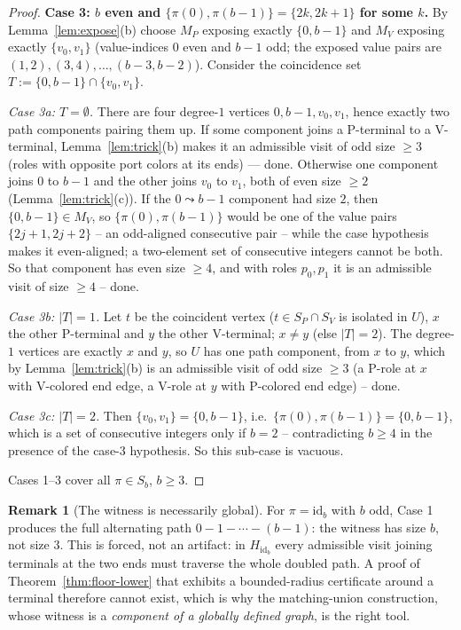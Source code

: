 \documentclass[11pt]{article}
\theoremstyle{definition}
\newtheorem{remark}[theorem]{Remark}
\begin{document}
\begin{proof}
\medskip
\noindent\textbf{Case 3: $b$ even and $\{\pi(0), \pi(b-1)\} = \{2k, 2k+1\}$ for some
$k$.}
By Lemma~\ref{lem:expose}(b) choose $M_P$ exposing exactly $\{0, b-1\}$ and $M_V$
exposing exactly $\{v_0, v_1\}$ (value-indices $0$ even and $b-1$ odd; the exposed
value pairs are $(1,2), (3,4), \dots, (b-3,b-2)$). Consider the coincidence set
$T := \{0, b-1\} \cap \{v_0, v_1\}$.

\emph{Case 3a: $T = \emptyset$.} There are four degree-$1$ vertices
$0, b-1, v_0, v_1$, hence exactly two path components pairing them up. If some
component joins a P-terminal to a V-terminal, Lemma~\ref{lem:trick}(b) makes it an
admissible visit of odd size $\ge 3$ (roles with opposite port colors at its ends) ---
done. Otherwise one component joins $0$ to $b-1$ and the other joins $v_0$ to $v_1$,
both of even size $\ge 2$ (Lemma~\ref{lem:trick}(c)). If the $0 \leadsto b-1$
component had size $2$, then $\{0,b-1\} \in M_V$, so $\{\pi(0), \pi(b-1)\}$ would be
one of the value pairs $\{2j+1, 2j+2\}$ -- an odd-aligned consecutive pair -- while
the case hypothesis makes it even-aligned; a two-element set of consecutive integers
cannot be both. So that component has even size $\ge 4$, and with roles $p_0, p_1$ it
is an admissible visit of size $\ge 4$ -- done.

\emph{Case 3b: $|T| = 1$.} Let $t$ be the coincident vertex ($t \in S_P \cap S_V$ is
isolated in $U$), $x$ the other P-terminal and $y$ the other V-terminal; $x \ne y$
(else $|T| = 2$). The degree-$1$ vertices are exactly $x$ and $y$, so $U$ has one path
component, from $x$ to $y$, which by Lemma~\ref{lem:trick}(b) is an admissible visit of
odd size $\ge 3$ (a P-role at $x$ with V-colored end edge, a V-role at $y$ with
P-colored end edge) -- done.

\emph{Case 3c: $|T| = 2$.} Then $\{v_0, v_1\} = \{0, b-1\}$, i.e.\
$\{\pi(0), \pi(b-1)\} = \{0, b-1\}$, which is a set of consecutive integers only if
$b = 2$ -- contradicting $b \ge 4$ in the presence of the case-3 hypothesis. So this
sub-case is vacuous.

\medskip
Cases 1--3 cover all $\pi \in S_b$, $b \ge 3$.
\end{proof}

\begin{remark}[The witness is necessarily global]\label{rem:global}
For $\pi = \mathrm{id}_b$ with $b$ odd, Case 1 produces the full alternating path
$0 - 1 - \cdots - (b-1)$: the witness has size $b$, not size $3$. This is forced, not
an artifact: in $H_{\mathrm{id}_b}$ every admissible visit joining terminals at the two
ends must traverse the whole doubled path. A proof of Theorem~\ref{thm:floor-lower}
that exhibits a bounded-radius certificate around a terminal therefore cannot exist,
which is why the matching-union construction, whose witness is a \emph{component of a
globally defined graph}, is the right tool.
\end{remark}
\end{document}

